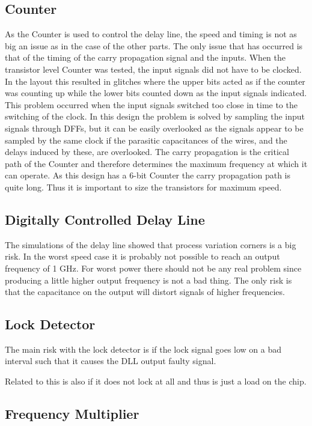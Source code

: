 \documentclass[a4paper,12pt]{article} \usepackage{graphicx}
\begin{document}
\subsection{Counter}
As the Counter is used to control the delay line, the speed and timing is not as
big an issue as in the case of the other parts. The only issue that has occurred
is that of the timing of the carry propagation signal and the inputs. When the
transistor level Counter was tested, the input signals did not have to be
clocked. In the layout this resulted in glitches where the upper bits acted as
if the counter was counting up while the lower bits counted down as the input
signals indicated. This problem occurred when the input signals switched too
close in time to the switching of the clock. In this design the problem is
solved by sampling the input signals through DFFs, but it can be easily
overlooked as the signals appear to be sampled by the same clock if the
parasitic capacitances of the wires, and the delays induced by these, are
overlooked. The carry propagation is the critical path of the Counter and
therefore determines the maximum frequency at which it can operate. As this
design has a 6-bit Counter the carry propagation path is quite long. Thus it is
important to size the transistors for maximum speed. 

\subsection{Digitally Controlled Delay Line}
The simulations of the delay line showed that process variation corners is a big
risk. In the worst speed case it is probably not possible to reach an output
frequency of 1 GHz. For worst power there should not be any real problem since
producing a little higher output frequency is not a bad thing. The only risk is
that the capacitance on the output will distort signals of higher frequencies.

\subsection{Lock Detector}
The main risk with the lock detector is if the lock signal goes low on a bad interval such that it causes the DLL output faulty signal.


Related to this is also if it does not lock at all and thus is just a load on the chip. 
\subsection{Frequency Multiplier}
\end{document}
